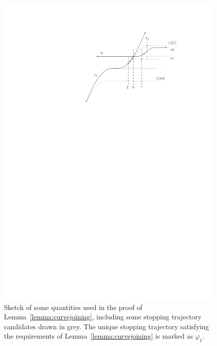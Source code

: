 \documentclass[a4paper]{article}
\theoremstyle{definition}
\theoremstyle{plain}
\begin{document}
\begin{figure}
  \centering
  \includegraphics[scale=1.0]{figures/motion/rough/curvejoiningproof}
  \caption{Sketch of some quantities used in the proof of
    Lemma~\ref{lemma:curvejoining}, including some stopping trajectory
    candidates drawn in grey. The unique stopping trajectory satisfying the requirements of
    Lemma~\ref{lemma:curvejoining} is marked as $\varphi_{1}$.
  }%
  \label{fig:proof}
\end{figure}
\end{document}
